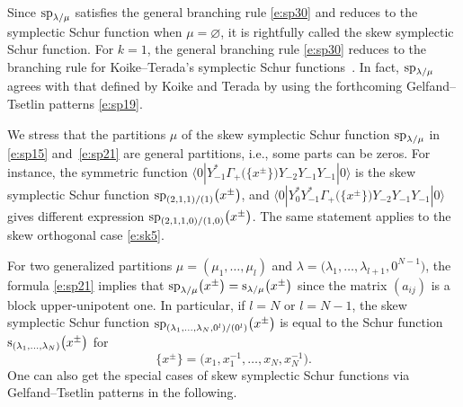 \documentclass[10pt,a4paper]{amsart}
\numberwithin{equation}{section}
\begin{document}
\begin{Remark} Since ${\rm sp}_{\lambda/\mu}$ satisfies the general branching rule \eqref{e:sp30} and reduces to the symplectic Schur function when $\mu=\varnothing$, it
is rightfully called
the skew symplectic Schur function. For $k=1$, the general branching rule \eqref{e:sp30} reduces to the branching rule for Koike--Terada's symplectic Schur functions~\cite[Theorem~3.1]{KT1990}. In fact, ${\rm sp}_{\lambda/\mu}$ agrees with that defined by Koike and Terada by using the forthcoming Gelfand--Tsetlin patterns \eqref{e:sp19}.
\end{Remark}
\begin{Remark}
We stress that the partitions $\mu$ of the skew symplectic Schur function ${\rm sp}_{\lambda/\mu}$
in \eqref{e:sp15} and~\eqref{e:sp21} are general partitions, i.e., some parts can be zeros. For instance, the symmetric function $\langle0|Y^*_{-1}\Gamma_+\big(\big\{x^{\pm}\big\}\big)Y_{-2}Y_{-1}Y_{-1}|0\rangle$ is the skew symplectic Schur function ${\rm sp}_{(2,1,1)/(1)}\big(x^{\pm}\big)$, and $\langle0|Y^*_{0}Y^*_{-1}\Gamma_+\big(\big\{x^{\pm}\big\}\big)Y_{-2}Y_{-1}Y_{-1}|0\rangle$ gives different expression ${\rm sp}_{(2,1,1,0)/(1,0)}\big(x^{\pm}\big)$.
The same statement applies to the skew orthogonal case \eqref{e:sk5}.
\end{Remark}
\begin{Remark}\label{e:remark1}
For two generalized partitions $\mu=(\mu_1,\dots,\mu_l)$ and $\lambda=\big(\lambda_1,\dots,\lambda_{l+1},0^{N-1}\big)$, the
formula \eqref{e:sp21} implies that
${\rm sp}_{\lambda/\mu}\big(x^{\pm}\big)={\rm s}_{\lambda/\mu}\big(x^{\pm}\big)$ since the matrix $(a_{ij})$ is a block upper-unipotent one.
In particular, if $l=N$ or $l=N-1$, the skew symplectic Schur function ${\rm sp}_{(\lambda_1,\dots,\lambda_N,0^l)/(0^l)}\big(x^{\pm}\big)$ is equal to the Schur function ${\rm s}_{(\lambda_1,\dots,\lambda_N)}\big(x^{\pm}\big)$ for
\[
\big\{x^{\pm}\big\}=\big(x_1,x^{-1}_1,\dots,x_N,x^{-1}_N\big).
\]
One can also get the special cases of skew symplectic Schur functions via Gelfand--Tsetlin patterns in the following.
\end{Remark}
\end{document}
